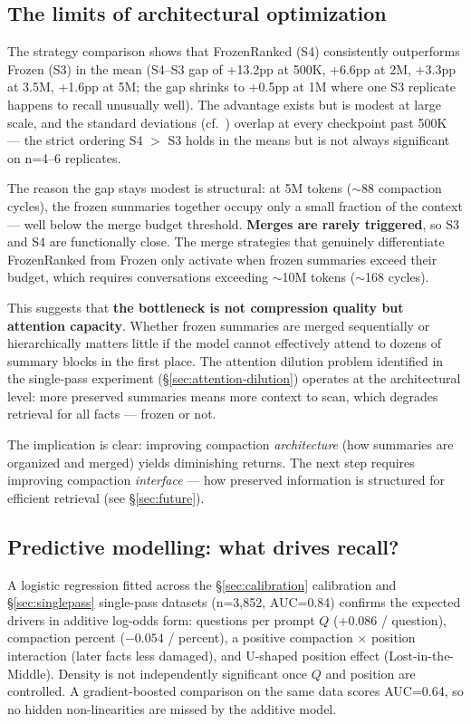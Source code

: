 \subsection{The limits of architectural optimization}
\label{sec:arch-limits}

The strategy comparison shows that FrozenRanked (S4) consistently
outperforms Frozen (S3) in the mean (S4--S3 gap of +13.2pp at 500K, +6.6pp
at 2M, +3.3pp at 3.5M, +1.6pp at 5M; the gap shrinks to +0.5pp at 1M
where one S3 replicate happens to recall unusually well). The advantage
exists but is modest at large scale, and the standard deviations (cf.\
) overlap at every checkpoint past 500K --- the strict ordering
S4 $>$ S3 holds in the means but is not always significant on n=4--6
replicates.

The reason the gap stays modest is structural: at 5M tokens ($\sim$88 compaction
cycles), the frozen summaries together occupy only a small fraction of the
context --- well below the merge budget threshold. \textbf{Merges are rarely
triggered}, so S3 and S4 are functionally close. The merge strategies
that genuinely differentiate FrozenRanked from Frozen only activate when
frozen summaries exceed their budget, which requires conversations
exceeding $\sim$10M tokens ($\sim$168 cycles).

This suggests that \textbf{the bottleneck is not compression quality but attention
capacity}. Whether frozen summaries are merged sequentially or
hierarchically matters little if the model cannot effectively attend to
dozens of summary blocks in the first place. The attention dilution problem
identified in the single-pass experiment (\S\ref{sec:attention-dilution}) operates at the architectural level: more
preserved summaries means more context to scan, which degrades retrieval
for all facts --- frozen or not.

The implication is clear: improving compaction \textit{architecture} (how summaries
are organized and merged) yields diminishing returns. The next step requires
improving compaction \textit{interface} --- how preserved information is structured
for efficient retrieval (see \S\ref{sec:future}).

\subsection{Predictive modelling: what drives recall?}
\label{sec:predictive}

A logistic regression fitted across the \S\ref{sec:calibration} calibration and \S\ref{sec:singlepass} single-pass
datasets (n=3{,}852, AUC=0.84) confirms the expected drivers in additive
log-odds form: questions per prompt $Q$ (+0.086 / question), compaction
percent ($-0.054$ / percent), a positive compaction $\times$ position interaction
(later facts less damaged), and U-shaped position effect (Lost-in-the-Middle).
Density is not independently significant once $Q$ and position are controlled.
A gradient-boosted comparison on the same data scores AUC=0.64, so no
hidden non-linearities are missed by the additive model.

